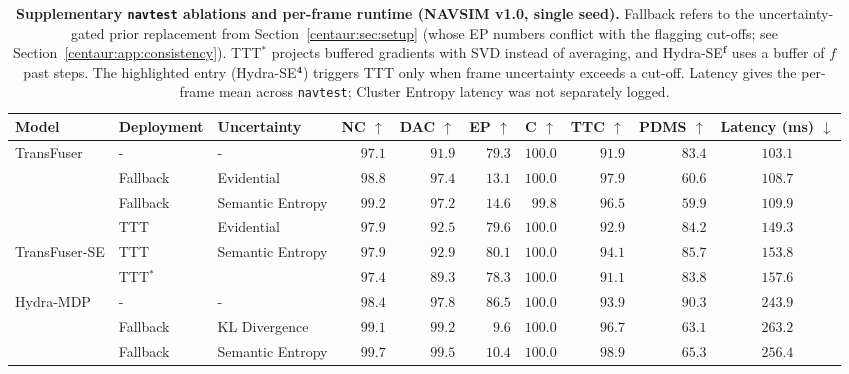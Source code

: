 \begin{table}
  \centering
  \caption[Extended \texttt{navtest} ablations and runtime]{\textbf{Supplementary \texttt{navtest} ablations and per-frame runtime (NAVSIM v1.0, single seed).} Fallback refers to the uncertainty-gated prior replacement from Section~\ref{centaur:sec:setup} (whose EP numbers conflict with the flagging cut-offs; see Section~\ref{centaur:app:consistency}). TTT$^{*}$ projects buffered gradients with SVD instead of averaging, and Hydra-SE$^{\mathbf{f}}$ uses a buffer of $f$ past steps. The highlighted entry (\colorbox{gray!50}{Hydra-SE$^{\mathbf{4}}$}) triggers TTT only when frame uncertainty exceeds a cut-off. Latency gives the per-frame mean across \texttt{navtest}; Cluster Entropy latency was not separately logged.}
  \label{centaur:tab:navtest_ablation_supp}
  \begin{adjustbox}{max width=\linewidth}
  \begin{tabular}{l|ll|rrrr|rr|c}
    \toprule
    \textbf{Model} & \textbf{Deployment} & \textbf{Uncertainty} & \textbf{NC} $\uparrow$ & \textbf{DAC} $\uparrow$ & \textbf{EP} $\uparrow$ & \textbf{C} $\uparrow$ & \textbf{TTC} $\uparrow$ & \textbf{PDMS} $\uparrow$ & \textbf{Latency (ms)} $\downarrow$ \\
    \midrule
    \multirow{4}{*}{TransFuser~\cite{chitta2023transfuser}} & - & - & $97.1$ & $91.9$ & $79.3$ & $100.0$ & $91.9$ & $83.4$ & $103.1$ \\
    & Fallback & Evidential & $98.8$ & $97.4$ & $13.1$ & $100.0$ & $97.9$ & $60.6$ & $108.7$ \\
    & Fallback & Semantic Entropy & $99.2$ & $97.2$ & $14.6$ & $99.8$ & $96.5$ & $59.9$ & $109.9$ \\
    & TTT & Evidential & $97.9$ & $92.5$ & $79.6$ & $100.0$ & $92.9$ & $84.2$ & $149.3$ \\
    \midrule
    \multirow{2}{*}{TransFuser-SE} & TTT & \multirow{2}{*}{Semantic Entropy} & $97.9$ & $92.9$ & $80.1$ & $100.0$ & $94.1$ & $85.7$ & $153.8$ \\
    & TTT$^{*}$ & & $97.4$ & $89.3$ & $78.3$ & $100.0$ & $91.1$ & $83.8$ & $157.6$ \\
    \midrule
    \multirow{4}{*}{Hydra-MDP~\cite{li2024hydramdp}} & - & - & $98.4$ & $97.8$ & $86.5$ & $100.0$ & $93.9$ & $90.3$ & $243.9$ \\
    & Fallback & KL Divergence & $99.1$ & $99.2$ & $9.6$ & $100.0$ & $96.7$ & $63.1$ & $263.2$ \\
    & Fallback & Semantic Entropy & $99.7$ & $99.5$ & $10.4$ & $100.0$ & $98.9$ & $65.3$ & $256.4$ \\

\end{tabular}
\end{adjustbox}
\end{table}
